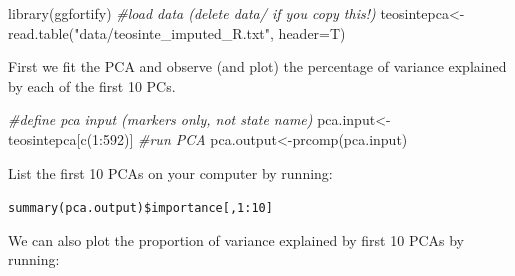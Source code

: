 \documentclass[
]{book}
\newenvironment{Shaded}{\begin{snugshade}}{\end{snugshade}}
\newcommand{\AttributeTok}[1]{\textcolor[rgb]{0.77,0.63,0.00}{#1}}
\newcommand{\CommentTok}[1]{\textcolor[rgb]{0.56,0.35,0.01}{\textit{#1}}}
\newcommand{\DecValTok}[1]{\textcolor[rgb]{0.00,0.00,0.81}{#1}}
\newcommand{\FloatTok}[1]{\textcolor[rgb]{0.00,0.00,0.81}{#1}}
\newcommand{\FunctionTok}[1]{\textcolor[rgb]{0.00,0.00,0.00}{#1}}
\newcommand{\NormalTok}[1]{#1}
\newcommand{\OtherTok}[1]{\textcolor[rgb]{0.56,0.35,0.01}{#1}}
\newcommand{\SpecialCharTok}[1]{\textcolor[rgb]{0.00,0.00,0.00}{#1}}
\newcommand{\StringTok}[1]{\textcolor[rgb]{0.31,0.60,0.02}{#1}}
\begin{document}
\begin{Shaded}
\begin{Highlighting}[]
\FunctionTok{library}\NormalTok{(ggfortify)}
\CommentTok{\#load data (delete \textquotesingle{}data/\textquotesingle{} if you copy this!)}
\NormalTok{teosintepca}\OtherTok{\textless{}{-}}\FunctionTok{read.table}\NormalTok{(}\StringTok{"data/teosinte\_imputed\_R.txt"}\NormalTok{, }\AttributeTok{header=}\NormalTok{T)}
\end{Highlighting}
\end{Shaded}

First we fit the PCA and observe (and plot) the percentage of variance explained by each of the first 10 PCs.

\begin{Shaded}
\begin{Highlighting}[]
\CommentTok{\#define pca input (markers only, not state name)}
\NormalTok{pca.input}\OtherTok{\textless{}{-}}\NormalTok{teosintepca[}\FunctionTok{c}\NormalTok{(}\DecValTok{1}\SpecialCharTok{:}\DecValTok{592}\NormalTok{)]}
\CommentTok{\#run PCA}
\NormalTok{pca.output}\OtherTok{\textless{}{-}}\FunctionTok{prcomp}\NormalTok{(pca.input)}
\end{Highlighting}
\end{Shaded}

List the first 10 PCAs on your computer by running:

\texttt{summary(pca.output)\$importance{[},1:10{]}}

We can also plot the proportion of variance explained by first 10 PCAs by running:

\begin{Shaded}
\end{Shaded}
\end{document}
